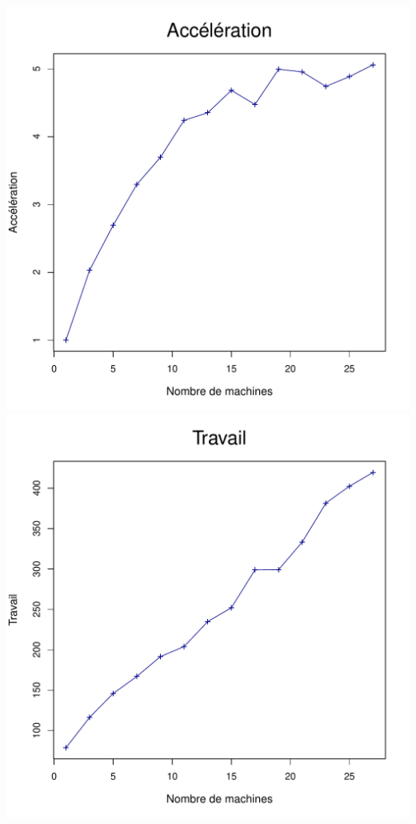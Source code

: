 \documentclass[a4paper, 11pt, titlepage]{article}
\begin{document}
\begin{center}
    \includegraphics[scale=0.45]{res/sujet_makefiles_blender_249_Makefile-recurse_nth1_acc.pdf}
    \includegraphics[scale=0.45]{res/sujet_makefiles_blender_249_Makefile-recurse_nth1_work.pdf}
\end{center}
\end{document}
